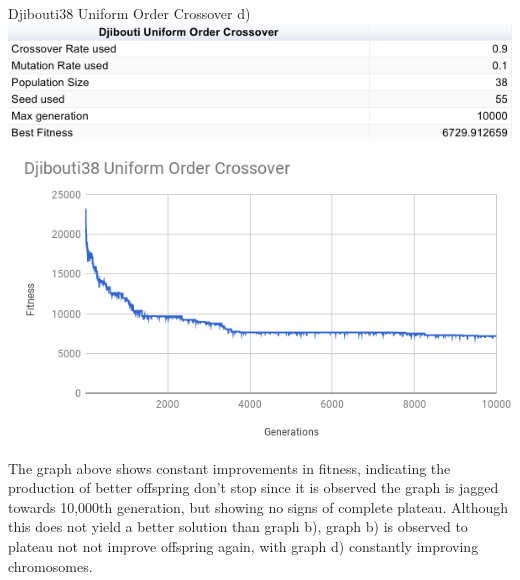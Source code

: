 \documentclass[conference]{IEEEtran}
\begin{document}
Djibouti38 Uniform Order Crossover d)
\includegraphics[scale=0.42]{Djibouti38/UOC/Djibouti38_UOC_d)_table}
\includegraphics[scale=0.42]{Djibouti38/UOC/Djibouti38_UOC_d)}
The graph above shows constant improvements in fitness, indicating the production of better offspring don't stop since it is observed the graph is jagged towards 10,000th generation, but showing no signs of complete plateau. Although this does not yield a better solution than graph b), graph b) is observed to plateau not not improve offspring again, with graph d) constantly improving chromosomes.\\
\end{document}
